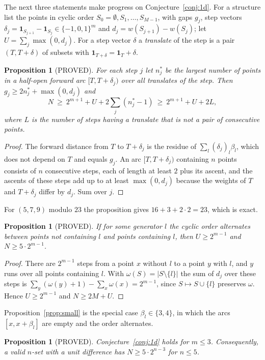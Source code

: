 \documentclass[11pt]{article}
\newtheorem{proposition}[theorem]{Proposition}
\theoremstyle{definition}
\begin{document}
The next three statements make progress on Conjecture~\ref{conj:1d}. For a structure list the points in cyclic order $S_0=\emptyset,S_1,\dots,S_{M-1}$, with gaps $g_j$, step vectors $\delta_j=\mathbf 1_{S_{j+1}}-\mathbf 1_{S_j}\in\{-1,0,1\}^m$ and $d_j=w(S_{j+1})-w(S_j)$; let $U=\sum_j\max(0,d_j)$. For a step vector $\delta$ a \emph{translate} of the step is a pair $(T,T+\delta)$ of subsets with $\mathbf 1_{T+\delta}=\mathbf 1_T+\delta$.
\begin{proposition}[PROVED]\label{prop:C}
For each step $j$ let $n_j^*$ be the largest number of points in a half-open forward arc $[T,T+\delta_j)$ over all translates of the step. Then $g_j\ge 2n_j^*+\max(0,d_j)$ and
\[ N\ \ge\ 2^{m+1}+U+2\sum_j (n_j^*-1)\ \ge\ 2^{m+1}+U+2L, \]
where $L$ is the number of steps having a translate that is not a pair of consecutive points.
\end{proposition}
\begin{proof}
The forward distance from $T$ to $T+\delta_j$ is the residue of $\sum_l(\delta_j)_l\beta_l$, which does not depend on $T$ and equals $g_j$. An arc $[T,T+\delta_j)$ containing $n$ points consists of $n$ consecutive steps, each of length at least $2$ plus its ascent, and the ascents of these steps add up to at least $\max(0,d_j)$ because the weights of $T$ and $T+\delta_j$ differ by $d_j$. Sum over $j$.
\end{proof}
For $(5,7,9)$ modulo $23$ the proposition gives $16+3+2\cdot2=23$, which is exact.
\begin{proposition}[PROVED]\label{prop:D}
If for some generator $l$ the cyclic order alternates between points not containing $l$ and points containing $l$, then $U\ge 2^{m-1}$ and $N\ge 5\cdot2^{m-1}$.
\end{proposition}
\begin{proof}
There are $2^{m-1}$ steps from a point $x$ without $l$ to a point $y$ with $l$, and $y$ runs over all points containing $l$. With $\omega(S)=|S\setminus\{l\}|$ the sum of $d_j$ over these steps is $\sum_y(\omega(y)+1)-\sum_x\omega(x)=2^{m-1}$, since $S\mapsto S\cup\{l\}$ preserves $\omega$. Hence $U\ge 2^{m-1}$ and $N\ge 2M+U$.
\end{proof}
Proposition~\ref{prop:small} is the special case $\beta_l\in\{3,4\}$, in which the arcs $[x,x+\beta_l]$ are empty and the order alternates.
\begin{proposition}[PROVED]\label{prop:E}
Conjecture~\ref{conj:1d} holds for $m\le 3$. Consequently, a valid $n$-set with a unit difference has $N\ge 5\cdot 2^{n-3}$ for $n\le 5$.
\end{proposition}
\end{document}
